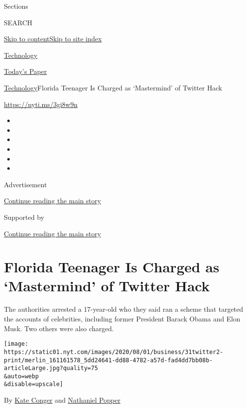 Sections

SEARCH

\protect\hyperlink{site-content}{Skip to
content}\protect\hyperlink{site-index}{Skip to site index}

\href{https://www.nytimes.com/section/technology}{Technology}

\href{https://myaccount.nytimes.com/auth/login?response_type=cookie\&client_id=vi}{}

\href{https://www.nytimes.com/section/todayspaper}{Today's Paper}

\href{/section/technology}{Technology}\textbar{}Florida Teenager Is
Charged as `Mastermind' of Twitter Hack

\url{https://nyti.ms/3gi8w9n}

\begin{itemize}
\item
\item
\item
\item
\item
\item
\end{itemize}

Advertisement

\protect\hyperlink{after-top}{Continue reading the main story}

Supported by

\protect\hyperlink{after-sponsor}{Continue reading the main story}

\hypertarget{florida-teenager-is-charged-as-mastermind-of-twitter-hack}{%
\section{Florida Teenager Is Charged as `Mastermind' of Twitter
Hack}\label{florida-teenager-is-charged-as-mastermind-of-twitter-hack}}

The authorities arrested a 17-year-old who they said ran a scheme that
targeted the accounts of celebrities, including former President Barack
Obama and Elon Musk. Two others were also charged.

\texttt{[image: https://static01.nyt.com/images/2020/08/01/business/31twitter2-print/merlin\_161161578\_5dd24641-dd88-4782-a57d-fad4dd7bb08b-articleLarge.jpg?quality=75\\\&auto=webp\\\&disable=upscale]}

By \href{https://www.nytimes.com/by/kate-conger}{Kate Conger} and
\href{https://www.nytimes.com/by/nathaniel-popper}{Nathaniel Popper}


